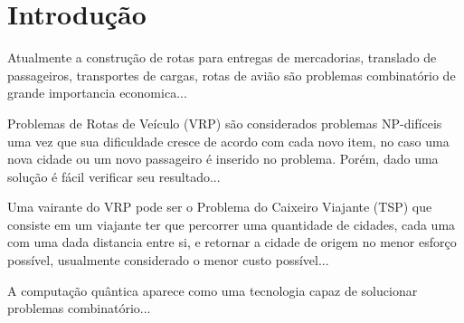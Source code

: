 
\chapter*[Introdução]{Introdução}

Atualmente a construção de rotas para entregas de mercadorias, translado de passageiros, transportes de cargas, rotas de avião são problemas combinatório de grande importancia economica...

Problemas de Rotas de Veículo (VRP) são considerados problemas NP-difíceis uma vez que sua dificuldade cresce de acordo com cada novo item, no caso uma nova cidade ou um novo passageiro é inserido no problema. Porém, dado uma solução é fácil verificar seu resultado...

Uma vairante do VRP pode ser o Problema do Caixeiro Viajante (TSP) que consiste em um viajante ter que percorrer uma quantidade de cidades, cada uma com uma dada distancia entre si, e retornar a cidade de origem no menor esforço possível, usualmente considerado o menor custo possível...

A computação quântica aparece como uma tecnologia capaz de solucionar problemas combinatório...